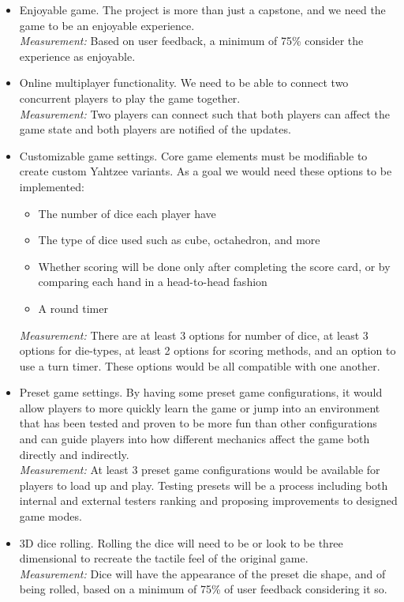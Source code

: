 \documentclass{article}
\begin{document}
\begin{itemize}
	\item Enjoyable game. The project is more than just a capstone, and we need the game to be an enjoyable experience.\\
	\textit{Measurement:} Based on user feedback, a minimum of 75\% consider the experience as enjoyable.

	\item Online multiplayer functionality. We need to be able to connect two concurrent players to play the game together.\\
	\textit{Measurement:} Two players can connect such that both players can affect the game state and both players are notified of the updates.
	
	\item Customizable game settings. Core game elements must be modifiable to create custom Yahtzee variants. As a goal we would need these options to be implemented:
	\begin{itemize}
        \item The number of dice each player have
        \item The type of dice used such as cube, octahedron, and more
        \item Whether scoring will be done only after completing the score card, or by comparing each hand in a head-to-head fashion
        \item A round timer
    \end{itemize}
	\textit{Measurement:} There are at least 3 options for number of dice, at least 3 options for die-types, at least 2 options for scoring methods, and an option to use a turn timer. These options would be all compatible with one another.
	
	\item Preset game settings. By having some preset game configurations, it would allow players to more quickly learn the game or jump into an environment that has been tested and proven to be more fun than other configurations and can guide players into how different mechanics affect the game both directly and indirectly.\\
	\textit{Measurement:} At least 3 preset game configurations would be available for players to load up and play. Testing presets will be a process including both internal and external testers ranking and proposing improvements to designed game modes.
	
	\item 3D dice rolling. Rolling the dice will need to be or look to be three dimensional to recreate the tactile feel of the original game.\\
	\textit{Measurement:} Dice will have the appearance of the preset die shape, and of being rolled, based on a minimum of 75\% of user feedback considering it so.
	
\end{itemize}
\end{document}
